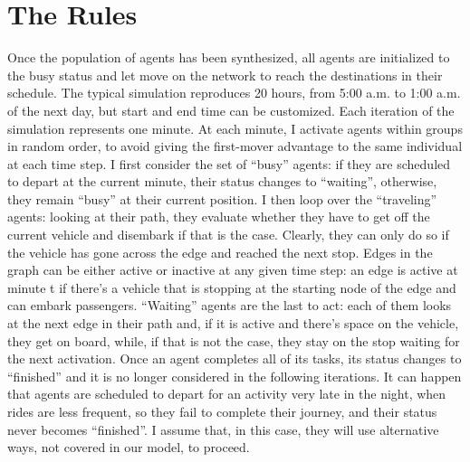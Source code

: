 \section{The Rules}\label{sec:3.4}

Once the population of agents has been synthesized, all agents are initialized to the busy status and let move on the network to reach the destinations in their schedule. 
The typical simulation reproduces 20 hours, from 5:00 a.m. to 1:00 a.m. of the next day, but start and end time can be customized.
Each iteration of the simulation represents one minute. At each minute, I activate agents within groups in random order, to avoid giving the first-mover advantage to the same individual at each time step. I first consider the set of “busy” agents: if they are scheduled to depart at the current minute, their status changes to “waiting”, otherwise, they remain “busy” at their current position. I then loop over the “traveling” agents: looking at their path, they evaluate whether they have to get off the current vehicle and disembark if that is the case. Clearly, they can only do so if the vehicle has gone across the edge and reached the next stop. Edges in the graph can be either active or inactive at any given time step: an edge is active at minute t if there’s a vehicle that is stopping at the starting node of the edge and can embark passengers. “Waiting” agents are the last to act: each of them looks at the next edge in their path and, if it is active and there’s space on the vehicle, they get on board, while, if that is not the case, they stay on the stop waiting for the next activation. Once an agent completes all of its tasks, its status changes to “finished” and it is no longer considered in the following iterations. It can happen that agents are scheduled to depart for an activity very late in the night, when rides are less frequent, so they fail to complete their journey, and their status never becomes “finished”. I assume that, in this case, they will use alternative ways, not covered in our model, to proceed. 

